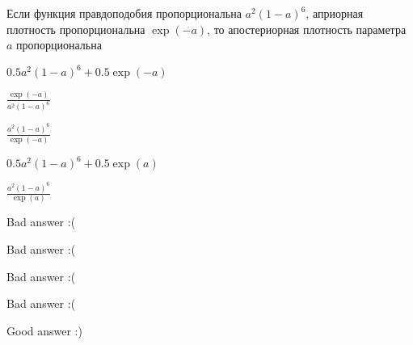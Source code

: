 
\begin{question}
Если функция правдоподобия пропорциональна \(a^2(1-a)^6\), априорная
плотность пропорциональна \(\exp(-a)\), то апостериорная плотность
параметра \(a\) пропорциональна
\begin{answerlist}
  \item \(0.5 a^2(1-a)^6 +0.5\exp(-a)\)
  \item \(\frac{\exp(-a)}{a^2(1-a)^6}\)
  \item \(\frac{a^2(1-a)^6}{\exp(-a)}\)
  \item \(0.5 a^2(1-a)^6 +0.5\exp(a)\)
  \item \(\frac{a^2(1-a)^6}{\exp(a)}\)
\end{answerlist}
\end{question}

\begin{solution}
\begin{answerlist}
  \item Bad answer :(
  \item Bad answer :(
  \item Bad answer :(
  \item Bad answer :(
  \item Good answer :)
\end{answerlist}
\end{solution}

